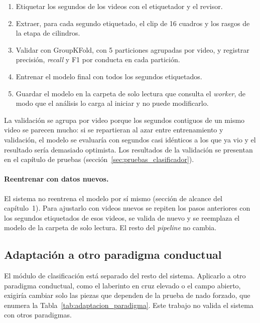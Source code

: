\begin{enumerate}
  \item Etiquetar los segundos de los videos con el etiquetador y el revisor.
  \item Extraer, para cada segundo etiquetado, el clip de 16 cuadros y los rasgos de la etapa de cilindros.
  \item Validar con GroupKFold, con 5 particiones agrupadas por video, y registrar precisión, \textit{recall} y F1
  por conducta en cada partición.
  \item Entrenar el modelo final con todos los segundos etiquetados.
  \item Guardar el modelo en la carpeta de solo lectura que consulta el \textit{worker}, de modo que el análisis lo
  carga al iniciar y no puede modificarlo.
\end{enumerate}

La validación se agrupa por video porque los segundos contiguos de un mismo video se parecen mucho: si se repartieran
al azar entre entrenamiento y validación, el modelo se evaluaría con segundos casi idénticos a los que ya vio y el
resultado sería demasiado optimista. Los resultados de la validación se presentan en el capítulo de pruebas
(sección~\ref{sec:pruebas_clasificador}).

\paragraph{Reentrenar con datos nuevos.} El sistema no reentrena el modelo por sí mismo (sección de alcance del
capítulo~1). Para ajustarlo con videos nuevos se repiten los pasos anteriores con los segundos etiquetados de esos
videos, se valida de nuevo y se reemplaza el modelo de la carpeta de solo lectura. El resto del \textit{pipeline} no
cambia.

\subsection{Adaptación a otro paradigma conductual}
\label{sec:adaptacion_paradigma}

El módulo de clasificación está separado del resto del sistema. Aplicarlo a otro paradigma conductual, como el
laberinto en cruz elevado o el campo abierto, exigiría cambiar solo las piezas que dependen de la prueba de nado
forzado, que enumera la Tabla~\ref{tab:adaptacion_paradigma}. Este trabajo no valida el sistema con otros
paradigmas.

